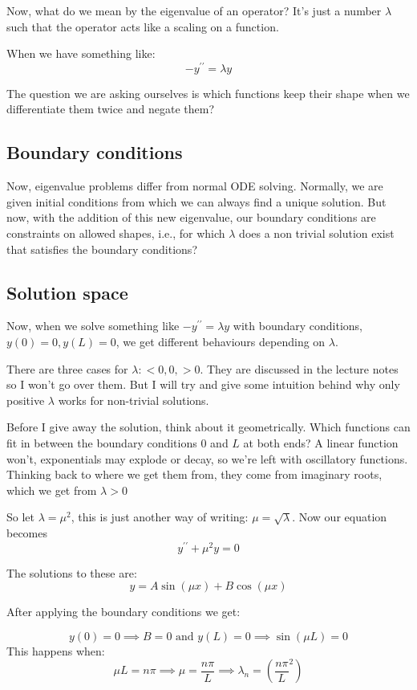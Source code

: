 Now, what do we mean by the eigenvalue of an operator? It's just a number $\lambda$ such that the operator acts like a scaling on a function. 

When we have something like: 
$$
-y^{\prime \prime} = \lambda y
$$

The question we are asking ourselves is which functions keep their shape when we differentiate them twice and negate them? 

\subsection{Boundary conditions}

Now, eigenvalue problems differ from normal ODE solving. Normally, we are given initial conditions from which we can always find a unique solution. But now, with the addition of this new eigenvalue, our boundary conditions are constraints on allowed shapes, i.e., for which $\lambda$ does a non trivial solution exist that satisfies the boundary conditions?

\subsection{Solution space}

Now, when we solve something like $-y^{\prime \prime} = \lambda y$ with boundary conditions, $y(0) = 0, y(L) = 0$, we get different behaviours depending on $\lambda$. 

There are three cases for $\lambda: <0, 0, >0$. They are discussed in the lecture notes so I won't go over them. But I will try and give some intuition behind why only positive $\lambda$ works for non-trivial solutions. 

Before I give away the solution, think about it geometrically. Which functions can fit in between the boundary conditions $0$ and $L$ at both ends? A linear function won't, exponentials may explode or decay, so we're left with oscillatory functions. Thinking back to where we get them from, they come from imaginary roots, which we get from $\lambda >0$

So let $\lambda = \mu^2$, this is just another way of writing: $\mu = \sqrt{\lambda}$. Now our equation becomes 
$$
y^{\prime \prime} + \mu^2 y = 0
$$

The solutions to these are: 
$$
y = A \sin(\mu x) + B \cos(\mu x) 
$$

After applying the boundary conditions we get: 

$$
y(0) = 0 \implies B = 0 \text{ and } y(L) = 0 \implies \sin(\mu L) = 0
$$
This happens when: 
$$
\mu L = n \pi \implies \mu = \frac{n\pi}{L} \implies \lambda_n = \left( \frac{n\pi}{L}^2 \right )
$$

